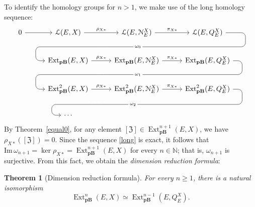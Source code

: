 \documentclass[12pt,a4paper]{amsproc}
\newtheorem{thm}{Theorem}[section]
\theoremstyle{remark}
\theoremstyle{definition}
\newcommand{\Ext}{\operatorname{Ext}}
\newcommand{\pBan}{\operatorname{\textbf{pB}}}
\numberwithin{equation}{section}
\begin{document}
To identify the homology groups for $n > 1$, we make use of the long homology sequence:
\begin{equation}\label{long}
	\begin{tikzcd}[column sep=1cm, row sep=.75cm]
		0 \arrow[r] & \mathcal{L}(E,X) \arrow[r, "\rho_{X*}"] & \mathcal{L}(E,\mathcal{N}_E^X) \arrow[r, "\pi_{X*}"]
		\arrow[dl, phantom, ""{coordinate, name=Z}]
		& \mathcal{L}(E,Q_E^X) \arrow[dll,
		"\omega_0" description, rounded corners=6pt,
		to path={ -- ([xshift=6.5ex]\tikztostart.east)
			|- (Z) [very near end] \tikztonodes
			-| ([xshift=-3ex]\tikztotarget.west)
			-- (\tikztotarget)}] \\
		& \Ext_{\boldsymbol{\pBan}}(E,X) \arrow[r, "\rho_{X*}"] & \Ext_{\boldsymbol{\pBan}}(E, \mathcal{N}_E^X) \arrow[r, "\pi_{X*}"]
		\arrow[dl, phantom, ""{coordinate, name=Z}]
		& \Ext_{\boldsymbol{\pBan}}(E, Q_E^X) \arrow[dll,
		"\omega_1" description, rounded corners=6pt,
		to path={ -- ([xshift=3ex]\tikztostart.east)
			|- (Z) [very near end] \tikztonodes
			-| ([xshift=-3ex]\tikztotarget.west)
			-- (\tikztotarget)}] \\
		& \Ext^2_{\boldsymbol{\pBan}}(E,X) \arrow[r, "\rho_{X*}"] & \Ext^2_{\boldsymbol{\pBan}}(E, \mathcal{N}_E^X) \arrow[r, "\pi_{X*}"]
		\arrow[dl, phantom, ""{coordinate, name=Z}]
		& \Ext^2_{\boldsymbol{\pBan}}(E, Q_E^X) \arrow[dll,
		"\omega_2" description, rounded corners=6pt,
		to path={ -- ([xshift=3ex]\tikztostart.east)
			|- (Z) [very near end] \tikztonodes
			-| ([xshift=-3ex]\tikztotarget.west)
			-- (\tikztotarget)}] \\
		& \cdots
	\end{tikzcd}
\end{equation}
By Theorem~\ref{equal0}, for any element $[\mathfrak{Z}] \in \Ext^{n+1}_{\boldsymbol{\pBan}}(E,X)$, we have $\rho_{X*}([\mathfrak{Z}]) = 0$. Since the sequence \eqref{long} is exact, it follows that $\mathrm{Im}\, \omega_{n+1} = \ker \rho_{X*} = \Ext^{n+1}_{\boldsymbol{\pBan}}(E,X)$ for every $n \in \mathbb{N}$; that is, $\omega_{n+1}$ is surjective. From this fact, we obtain the \emph{dimension reduction formula}:

\begin{thm}[Dimension reduction formula]\label{reductionformula}
	For every $n \ge 1$, there is a natural isomorphism
	\begin{equation}\label{eq:red_formula}
		\Ext_{\boldsymbol{\pBan}}^{n}(E,X) \simeq \Ext^{n-1}_{\boldsymbol{\pBan}}(E,Q_E^X).
	\end{equation}
\end{thm}
\end{document}
